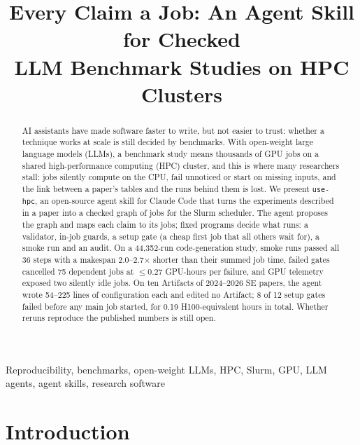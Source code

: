 \documentclass[10pt,conference]{IEEEtran}
\newcommand{\tool}{\texttt{use-hpc}}
\begin{document}
\title{Every Claim a Job: An Agent Skill for Checked\\LLM Benchmark Studies on HPC Clusters}

\author{
}

\maketitle

\begin{abstract}
AI assistants have made software faster to write, but not easier to trust: whether a technique works at scale is still decided by benchmarks. With open-weight large language models (LLMs), a benchmark study means thousands of GPU jobs on a shared high-performance computing (HPC) cluster, and this is where many researchers stall: jobs silently compute on the CPU, fail unnoticed or start on missing inputs, and the link between a paper's tables and the runs behind them is lost. We present \tool{}, an open-source agent skill for Claude Code that turns the experiments described in a paper into a checked graph of jobs for the Slurm scheduler. The agent proposes the graph and maps each claim to its jobs; fixed programs decide what runs: a validator, in-job guards, a setup gate (a cheap first job that all others wait for), a smoke run and an audit. On a 44{,}352-run code-generation study, smoke runs passed all 36 steps with a makespan 2.0--2.7$\times$ shorter than their summed job time, failed gates cancelled 75 dependent jobs at $\le$0.27 GPU-hours per failure, and GPU telemetry exposed two silently idle jobs. On ten Artifacts of 2024--2026 SE papers, the agent wrote 54--225 lines of configuration each and edited no Artifact; 8 of 12 setup gates failed before any main job started, for 0.19 H100-equivalent hours in total. Whether reruns reproduce the published numbers is still open.
\end{abstract}

\begin{IEEEkeywords}
Reproducibility, benchmarks, open-weight LLMs, HPC, Slurm, GPU, LLM agents, agent skills, research software
\end{IEEEkeywords}

\section{Introduction}\label{sec:intro}
\end{document}
